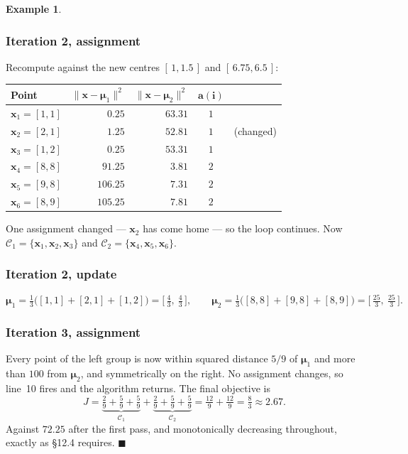 \documentclass[11pt]{article}
\theoremstyle{plain}
\theoremstyle{definition}
\newtheorem{ex}{Example}[section]
\theoremstyle{remark}
\newcommand{\vc}[1]{\mathbf{#1}}
\newcommand{\norm}[1]{\lVert #1\rVert}
\newcommand{\Cl}{\mathcal{C}}
\newcommand{\bmu}{\boldsymbol{\mu}}
\begin{document}
\begin{ex}
\subsubsection*{Iteration 2, assignment}
Recompute against the new centres $[\,1,1.5\,]$ and $[\,6.75,6.5\,]$:

\begin{center}
\renewcommand{\arraystretch}{1.2}
\begin{tabular}{@{}l r r c l@{}}
\toprule
\textbf{Point} & $\norm{\vc{x}-\bmu_1}^{2}$ & $\norm{\vc{x}-\bmu_2}^{2}$
  & $\boldsymbol{a(i)}$ & \\
\midrule
$\vc{x}_1=[1,1]$ & $0.25$   & $63.31$ & $1$ & \\
$\vc{x}_2=[2,1]$ & $1.25$   & $52.81$ & $1$ & \small(changed) \\
$\vc{x}_3=[1,2]$ & $0.25$   & $53.31$ & $1$ & \\
$\vc{x}_4=[8,8]$ & $91.25$  & $3.81$  & $2$ & \\
$\vc{x}_5=[9,8]$ & $106.25$ & $7.31$  & $2$ & \\
$\vc{x}_6=[8,9]$ & $105.25$ & $7.81$  & $2$ & \\
\bottomrule
\end{tabular}
\end{center}

\noindent One assignment changed --- $\vc{x}_2$ has come home --- so the loop
continues. Now
$\Cl_1=\{\vc{x}_1,\vc{x}_2,\vc{x}_3\}$ and
$\Cl_2=\{\vc{x}_4,\vc{x}_5,\vc{x}_6\}$.

\subsubsection*{Iteration 2, update}
\[
  \bmu_1 = \tfrac13\bigl([1,1]+[2,1]+[1,2]\bigr)
             = \bigl[\,\tfrac43,\ \tfrac43\,\bigr],
  \qquad
  \bmu_2 = \tfrac13\bigl([8,8]+[9,8]+[8,9]\bigr)
             = \bigl[\,\tfrac{25}{3},\ \tfrac{25}{3}\,\bigr] .
\]

\subsubsection*{Iteration 3, assignment}
Every point of the left group is now within squared distance $5/9$ of
$\bmu_1$ and more than $100$ from $\bmu_2$, and symmetrically on the
right. No assignment changes, so line~10 fires and the algorithm returns. The
final objective is
\[
  J = \underbrace{\tfrac29+\tfrac59+\tfrac59}_{\Cl_1}
    + \underbrace{\tfrac29+\tfrac59+\tfrac59}_{\Cl_2}
    = \tfrac{12}{9}+\tfrac{12}{9} = \tfrac83 \approx 2.67 .
\]
Against $72.25$ after the first pass, and monotonically decreasing throughout,
exactly as \S12.4 requires. \hfill$\blacksquare$
\end{ex}
\end{document}
